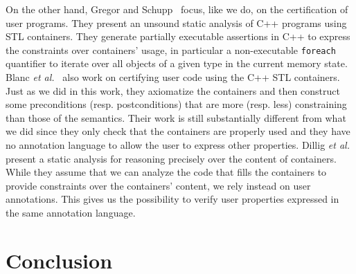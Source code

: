 \documentclass[runningheads,a4paper]{llncs}
\newcommand{\resp}{resp.\xspace}
\newcommand{\etal}{\textit{et al.}\xspace}
\newcommand{\beforesec}{\vspace{-0.2cm}}
\newcommand{\aftersec}{\vspace{-0.2cm}}
\begin{document}
On the other hand, Gregor and Schupp~\cite{gregor:2006:spe} focus, like we do,
on the certification of user programs. They present an unsound static analysis
of C++ programs using STL containers. They generate partially executable
assertions in C++ to express the constraints over containers' usage, in
particular a non-executable \texttt{foreach} quantifier to iterate over all objects of a given
type in the current memory state.  Blanc \etal~\cite{blanc:2007:ase} also work
on certifying user code using the C++ STL
containers. Just as we did in this work, they axiomatize the containers and
then construct some preconditions (\resp postconditions) that are more (\resp
less) constraining than those of the semantics. Their work is still
substantially different from what we did since they only check that the
containers are properly used and they have no annotation language to allow the
user to express other properties.
Dillig \etal~\cite{dillig:2011:popl} present a static analysis for reasoning
precisely over the content of containers. While they assume that we can analyze
the code that fills the containers to provide constraints over the
containers' content, we rely instead on user annotations. This gives
us the possibility to verify user properties expressed in the same
annotation language.



\beforesec
\section{Conclusion}
\label{sec:conclusion}
\aftersec
\end{document}
